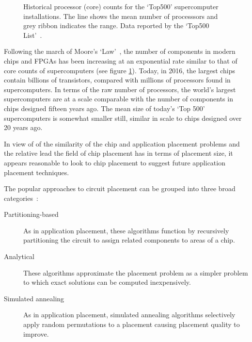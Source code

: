 			\begin{figure}
				\center
				
				\caption[Historical core counts for the `Top500' supercomputers.]%
				{Historical processor (core) counts for the `Top500' supercomputer
				installations. The line shows the mean number of processsors and grey
				ribbon indicates the range. Data reported by the `Top500
				List'~\cite{meuer16j}.}
				\label{fig:top500-num-processors}
			\end{figure}
			
			Following the march of Moore's `Law'~\cite{moore75}, the number of
			components in modern chips and FPGAs has been increasing at an
			exponential rate similar to that of core counts of supercomputers (see
			figure \ref{fig:top500-num-processors}). Today, in 2016, the largest
			chips contain billions of transistors, compared with millions of
			processors found in supercomputers. In terms of the raw number of
			processors, the world's largest supercomputers are at a scale comparable
			with the number of components in chips designed fifteen years ago. The
			mean size of today's `Top 500' supercomputers is somewhat smaller still,
			similar in scale to chips designed over 20 years ago.
			
			In view of of the similarity of the chip and application placement
			problems and the relative lead the field of chip placement has in terms
			of placement size, it appears reasonable to look to chip placement to
			suggest future application placement techniques.
			
			The popular approaches to circuit placement can be grouped into three
			broad categories~\cite{kahng11}:
			
			\begin{description}
				
				\item[Partitioning-based] As in application placement, these algorithms
				function by recursively partitioning the circuit to assign
				related components to areas of a chip.
				
				\item[Analytical] These algorithms approximate the placement problem as
				a simpler problem to which exact solutions can be computed
				inexpensively.
				
				\item[Simulated annealing] As in application placement, simulated
				annealing algorithms selectively apply random permutations to a
				placement causing placement quality to improve.
				
			\end{description}
			

